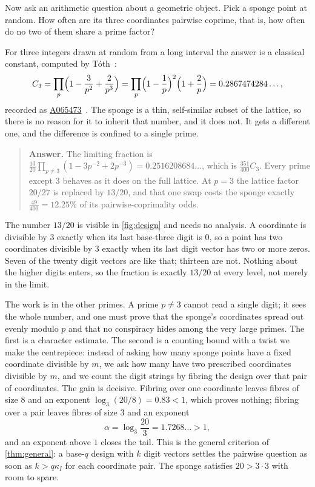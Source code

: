 \documentclass[11pt]{amsart}
\theoremstyle{definition}
\theoremstyle{remark}
\begin{document}
Now ask an arithmetic question about a geometric object. Pick a sponge point at random. How often are its three coordinates pairwise coprime, that is, how often do no two of them share a prime factor?

For three integers drawn at random from a long interval the answer is a classical constant, computed by T\'oth~\cite{toth}:
\[
C_3=\prod_p\Bigl(1-\frac{3}{p^2}+\frac{2}{p^3}\Bigr)
=\prod_p\Bigl(1-\frac1p\Bigr)^2\Bigl(1+\frac2p\Bigr)
=0.2867474284\ldots,
\]
recorded as \href{https://oeis.org/A065473}{A065473}~\cite{oeisA065473}. The sponge is a thin, self-similar subset of the lattice, so there is no reason for it to inherit that number, and it does not. It gets a different one, and the difference is confined to a single prime.

\begin{quote}
\textbf{Answer.} The limiting fraction is $\frac{13}{20}\prod_{p\ne3}(1-3p^{-2}+2p^{-3})=0.2516208684\ldots$, which is $\frac{351}{400}C_3$. Every prime except $3$ behaves as it does on the full lattice. At $p=3$ the lattice factor $20/27$ is replaced by $13/20$, and that one swap costs the sponge exactly $\frac{49}{400}=12.25\%$ of its pairwise-coprimality odds.
\end{quote}

The number $13/20$ is visible in \cref{fig:design} and needs no analysis. A coordinate is divisible by $3$ exactly when its last base-three digit is $0$, so a point has two coordinates divisible by $3$ exactly when its last digit vector has two or more zeros. Seven of the twenty digit vectors are like that; thirteen are not. Nothing about the higher digits enters, so the fraction is exactly $13/20$ at every level, not merely in the limit.

The work is in the other primes. A prime $p\ne3$ cannot read a single digit; it sees the whole number, and one must prove that the sponge's coordinates spread out evenly modulo $p$ and that no conspiracy hides among the very large primes. The first is a character estimate. The second is a counting bound with a twist we make the centrepiece: instead of asking how many sponge points have a fixed coordinate divisible by $m$, we ask how many have two prescribed coordinates divisible by $m$, and we count the digit strings by fibring the design over that pair of coordinates. The gain is decisive. Fibring over one coordinate leaves fibres of size $8$ and an exponent $\log_3(20/8)=0.83<1$, which proves nothing; fibring over a pair leaves fibres of size $3$ and an exponent
\[
\alpha=\log_3\frac{20}{3}=1.7268\ldots>1,
\]
and an exponent above $1$ closes the tail. This is the general criterion of \cref{thm:general}: a base-$q$ design with $k$ digit vectors settles the pairwise question as soon as $k>q\kappa_I$ for each coordinate pair. The sponge satisfies $20>3\cdot3$ with room to spare.
\end{document}
